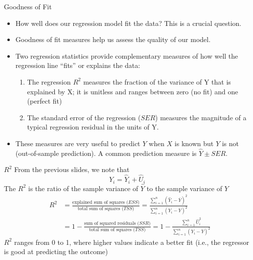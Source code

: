\documentclass[notes,10pt, aspectratio=169]{beamer}
\begin{document}
\begin{frame}{Goodness of Fit}
\begin{itemize}
\item How well does our regression model fit the data? This is a crucial question.
\item Goodness of fit measures help us assess the quality of our model.
\item Two regression statistics provide complementary measures of how well the regression line “fits” or explains the data:
\begin{enumerate}
    \item The regression $R^2$ measures the fraction of the variance of Y that is explained by X; it is unitless and ranges between zero (no fit) and one (perfect fit)
    \item The standard error of the regression ($SER$) measures the magnitude of a typical regression residual in the units of Y.
\end{enumerate}
\item These measures are very useful to predict $Y$ when $X$ is known but $Y$ is not (out-of-sample prediction). A common prediction measure is $\hat{Y}\pm SER$.
\end{itemize}
\end{frame}


\begin{frame}{$R^2$}
From the previous slides, we note that
\begin{equation*}
    Y_i = \hat{Y}_i + \hat{U}_i
\end{equation*}
The $R^2$ is the ratio of the sample variance of $\hat{Y}$ to the sample variance of $Y$
\begin{eqnarray*}
    &R^2 &= \frac{\text{explained sum of squares ($ESS$)}}{\text{total sum of squares ($TSS$)}} = \frac{\sum_{i=1}^n (\hat{Y}_i - \overline{Y})^2}{\sum_{i=1}^n (Y_i - \overline{Y})^2}\\
    & &= 1-\frac{\text{sum of squared residuals ($SSR$)}}{\text{total sum of squares ($TSS$)}} = 1-\frac{\sum_{i=1}^n \hat{U}_i^2}{\sum_{i=1}^n (Y_i - \overline{Y})^2}
\end{eqnarray*}
$R^2$ ranges from 0 to 1, where higher values indicate a better fit (i.e., the regressor is good at predicting the outcome)
\end{frame}
\end{document}
